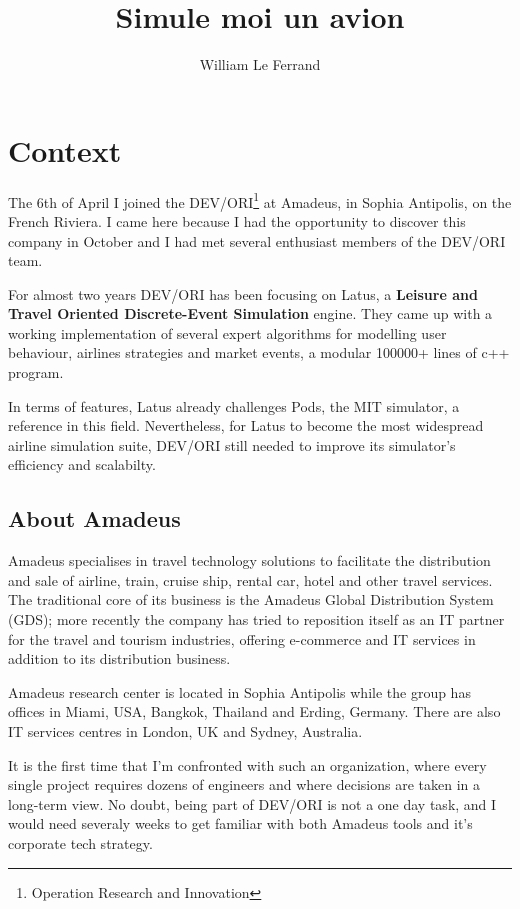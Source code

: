 \documentclass[11pt]{JHEP3}
\title{Simule moi un avion}
\author{William Le Ferrand}
\begin{document}
\maketitle 
\newpage

\section{Context}

The 6th of April I joined the DEV/ORI\footnote{Operation Research and Innovation} at Amadeus, in Sophia Antipolis, on the French Riviera. I came here because I had the opportunity to discover this company in October and I had met several enthusiast members of the DEV/ORI team.

For almost two years DEV/ORI has been focusing on Latus, a \textbf{Leisure and Travel Oriented Discrete-Event Simulation} engine. They came up with a working implementation of several expert algorithms for modelling user behaviour, airlines strategies and market events, a modular 100000+ lines of c++ program.

In terms of features, Latus already challenges Pods, the MIT simulator, a reference in this field. Nevertheless, for Latus to become the most widespread airline simulation suite, DEV/ORI still needed to improve its simulator's efficiency and scalabilty. 

\subsection{About Amadeus}

Amadeus specialises in travel technology solutions to facilitate the distribution and sale of airline, train, cruise ship, rental car, hotel and other travel services. The traditional core of its business is the Amadeus Global Distribution System (GDS); more recently the company has tried to reposition itself as an IT partner for the travel and tourism industries, offering e-commerce and IT services in addition to its distribution business.

Amadeus research center is located in Sophia Antipolis while the group has offices in Miami, USA, Bangkok, Thailand and Erding, Germany. There are also IT services centres in London, UK and Sydney, Australia.

It is the first time that I'm confronted with such an organization, where every single project requires dozens of engineers and where decisions are taken in a long-term view. No doubt, being part of DEV/ORI is not a one day task, and I would need severaly weeks to get familiar with both Amadeus tools and it's corporate tech strategy.
\end{document}
